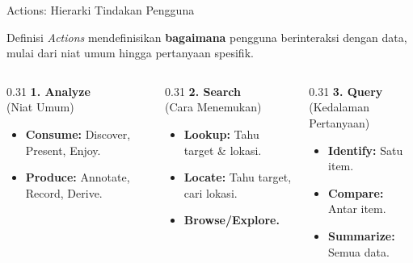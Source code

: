 \documentclass[t]{beamer}
\begin{document}
\begin{frame}{Actions: Hierarki Tindakan Pengguna}
    \begin{block}{Definisi}
        \textit{Actions} mendefinisikan \textbf{bagaimana} pengguna berinteraksi dengan data, mulai dari niat umum hingga pertanyaan spesifik.
    \end{block}

    \vspace{0.3cm}
    \begin{columns}[t]
        \begin{column}{0.31\textwidth}
            \textbf{1. Analyze} \\
            \scriptsize (Niat Umum)
            \begin{itemize}
                \item \textbf{Consume:} Discover, Present, Enjoy.
                \item \textbf{Produce:} Annotate, Record, Derive.
            \end{itemize}
        \end{column}
        \begin{column}{0.31\textwidth}
            \textbf{2. Search} \\
            \scriptsize (Cara Menemukan)
            \begin{itemize}
                \item \textbf{Lookup:} Tahu target \& lokasi.
                \item \textbf{Locate:} Tahu target, cari lokasi.
                \item \textbf{Browse/Explore.}
            \end{itemize}
        \end{column}
        \begin{column}{0.31\textwidth}
            \textbf{3. Query} \\
            \scriptsize (Kedalaman Pertanyaan)
            \begin{itemize}
                \item \textbf{Identify:} Satu item.
                \item \textbf{Compare:} Antar item.
                \item \textbf{Summarize:} Semua data.
            \end{itemize}
        \end{column}
    \end{columns}
\end{frame}
\end{document}
